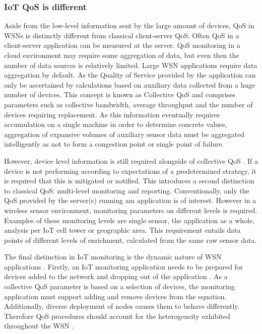 \subsubsection{IoT QoS is different}
Aside from the low-level information sent by the large amount of devices, QoS in WSNs is distinctly different from classical client-server QoS. Often QoS in a client-server application can be measured at the server. QoS monitoring in a cloud environment may require some aggregation of data, but even then the number of data sources is relatively limited. Large WSN applications require data aggregation by default. As the Quality of Service provided by the application can only be ascertained by calculations based on auxiliary data collected from a huge number of devices. This concept is known as Collective QoS \cite{qos_specific_wsn} and comprises parameters such as collective bandwidth, average throughput and the number of devices requiring replacement. As this information eventually requires accumulation on a single machine in order to determine concrete values, aggregation of expansive volumes of auxiliary sensor data must be aggregated intelligently as not to form a congestion point or single point of failure.

However, device level information is still required alongside of collective QoS \cite{device_level}. If a device is not performing according to expectations of a predetermined strategy, it is required that this is mitigated or notified. This introduces a second distinction to classical QoS: multi-level monitoring and reporting. Conventionally, only the QoS provided by the server(s) running am application is of interest. However in a wireless sensor environment, monitoring parameters on different levels is required. Examples of these monitoring levels are single sensor, the application as a whole, analysis per IoT cell tower or geographic area. This requirement entails data points of different levels of enrichment, calculated from the same raw sensor data.

The final distinction in IoT monitoring is the dynamic nature of WSN applications \cite{popularity_applications_qos_moeilijk}. Firstly, an IoT monitoring application needs to be prepared for devices added to the network and dropping out of the application \cite{ontology}. As a collective QoS parameter is based on a selection of devices, the monitoring application must support adding and remove devices from the equation. Additionally, diverse deployment of nodes causes them to behave differently. Therefore QoS procedures should account for the heterogeneity exhibited throughout the WSN \cite{energy_challenges}.

